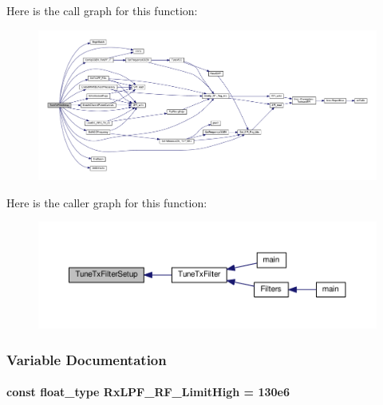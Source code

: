 Here is the call graph for this function\+:
\nopagebreak
\begin{figure}[H]
\begin{center}
\leavevmode
\includegraphics[width=350pt]{d2/da6/lms7002m__filters_8c_af1361ae85c78643bf99447e7251304fb_cgraph}
\end{center}
\end{figure}




Here is the caller graph for this function\+:
\nopagebreak
\begin{figure}[H]
\begin{center}
\leavevmode
\includegraphics[width=350pt]{d2/da6/lms7002m__filters_8c_af1361ae85c78643bf99447e7251304fb_icgraph}
\end{center}
\end{figure}




\subsubsection{Variable Documentation}
\paragraph[{Rx\+L\+P\+F\+\_\+\+R\+F\+\_\+\+Limit\+High}]{\setlength{\rightskip}{0pt plus 5cm}const {\bf float\+\_\+type} Rx\+L\+P\+F\+\_\+\+R\+F\+\_\+\+Limit\+High = 130e6\hspace{0.3cm}{\ttfamily [static]}}\label{lms7002m__filters_8c_a05c91ce39e2a5164631243875e3dd63c}


